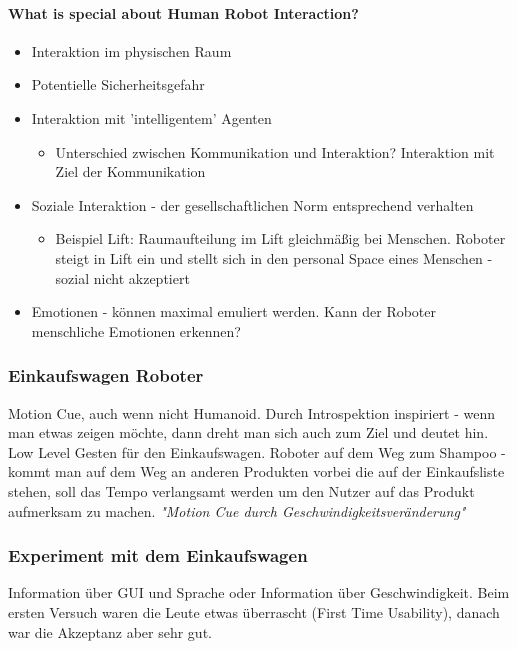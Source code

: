 \paragraph{What is special about Human Robot Interaction?}

\begin{itemize}
\item Interaktion im physischen Raum
\item Potentielle Sicherheitsgefahr
\item Interaktion mit 'intelligentem' Agenten
	\begin{itemize}
	\item{Unterschied zwischen Kommunikation und Interaktion? Interaktion mit Ziel der
	Kommunikation}
	\end{itemize}
\item Soziale Interaktion - der gesellschaftlichen Norm entsprechend verhalten
	\begin{itemize}
	\item{Beispiel Lift: Raumaufteilung im Lift gleichmäßig bei Menschen. Roboter
	steigt in Lift ein und stellt sich in den personal Space eines Menschen - sozial nicht
	akzeptiert}
	\end{itemize}
\item{Emotionen - können maximal emuliert werden. Kann der Roboter menschliche Emotionen
erkennen?}
\end{itemize}

\subsubsection{Einkaufswagen Roboter}

Motion Cue, auch wenn nicht Humanoid. Durch Introspektion inspiriert - wenn man etwas
zeigen möchte, dann dreht man sich auch zum Ziel und deutet hin. 
Low Level Gesten für den Einkaufswagen. 
Roboter auf dem Weg zum Shampoo - kommt man auf dem Weg an anderen Produkten vorbei die
auf der Einkaufsliste stehen, soll das Tempo verlangsamt werden um den Nutzer auf das
Produkt aufmerksam zu machen.
\textit{"Motion Cue durch Geschwindigkeitsveränderung"}

\subsubsection{Experiment mit dem Einkaufswagen}
Information über GUI und Sprache oder Information über Geschwindigkeit. 
Beim ersten Versuch waren die Leute etwas überrascht (First Time Usability), danach
war die Akzeptanz aber sehr gut.

